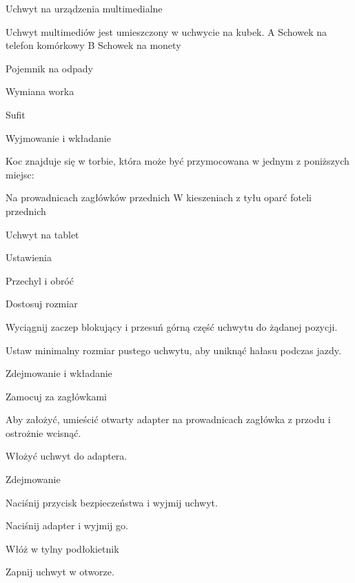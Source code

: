 Uchwyt na urządzenia multimedialne


Uchwyt multimediów jest umieszczony w uchwycie na kubek.
A Schowek na telefon komórkowy
B Schowek na monety

Pojemnik na odpady

Wymiana worka


Sufit

Wyjmowanie i wkładanie

Koc znajduje się w torbie, która może być przymocowana w jednym z poniższych miejsc:
\begin{itemizeTriangle}
	\itemTriangle Na prowadnicach zagłówków przednich
	\itemTriangle W kieszeniach z tyłu oparć foteli przednich
\end{itemizeTriangle}

Uchwyt na tablet


Ustawienia

Przechyl i obróć

Dostosuj rozmiar

\begin{itemizeArrow}
	\itemArrow Wyciągnij zaczep blokujący i przesuń górną część uchwytu do żądanej pozycji.
\end{itemizeArrow}

Ustaw minimalny rozmiar pustego uchwytu, aby uniknąć hałasu podczas jazdy.

Zdejmowanie i wkładanie

Zamocuj za zagłówkami
\begin{itemizeArrow}
	\itemArrow Aby założyć, umieścić otwarty adapter na prowadnicach zagłówka z przodu i ostrożnie wcisnąć.
\end{itemizeArrow}
\begin{itemizeArrow}
	\itemArrow Włożyć uchwyt do adaptera.
\end{itemizeArrow}

Zdejmowanie
\begin{itemizeArrow}
	\itemArrow Naciśnij przycisk bezpieczeństwa i wyjmij uchwyt.
\end{itemizeArrow}
\begin{itemizeArrow}
	\itemArrow Naciśnij adapter i wyjmij go.
\end{itemizeArrow}

Włóż w tylny podłokietnik
\begin{itemizeArrow}
	\itemArrow Zapnij uchwyt w otworze.
\end{itemizeArrow}

